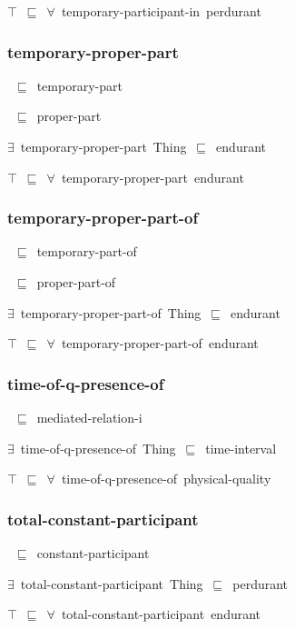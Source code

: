 \documentclass{article}
\begin{document}
\ensuremath{\top}~\ensuremath{\sqsubseteq}~\ensuremath{\forall}~temporary-participant-in~perdurant

\subsubsection*{temporary-proper-part}

~\ensuremath{\sqsubseteq}~temporary-part

~\ensuremath{\sqsubseteq}~proper-part

\ensuremath{\exists}~temporary-proper-part~Thing~\ensuremath{\sqsubseteq}~endurant

\ensuremath{\top}~\ensuremath{\sqsubseteq}~\ensuremath{\forall}~temporary-proper-part~endurant

\subsubsection*{temporary-proper-part-of}

~\ensuremath{\sqsubseteq}~temporary-part-of

~\ensuremath{\sqsubseteq}~proper-part-of

\ensuremath{\exists}~temporary-proper-part-of~Thing~\ensuremath{\sqsubseteq}~endurant

\ensuremath{\top}~\ensuremath{\sqsubseteq}~\ensuremath{\forall}~temporary-proper-part-of~endurant

\subsubsection*{time-of-q-presence-of}

~\ensuremath{\sqsubseteq}~mediated-relation-i

\ensuremath{\exists}~time-of-q-presence-of~Thing~\ensuremath{\sqsubseteq}~time-interval

\ensuremath{\top}~\ensuremath{\sqsubseteq}~\ensuremath{\forall}~time-of-q-presence-of~physical-quality

\subsubsection*{total-constant-participant}

~\ensuremath{\sqsubseteq}~constant-participant

\ensuremath{\exists}~total-constant-participant~Thing~\ensuremath{\sqsubseteq}~perdurant

\ensuremath{\top}~\ensuremath{\sqsubseteq}~\ensuremath{\forall}~total-constant-participant~endurant
\end{document}
